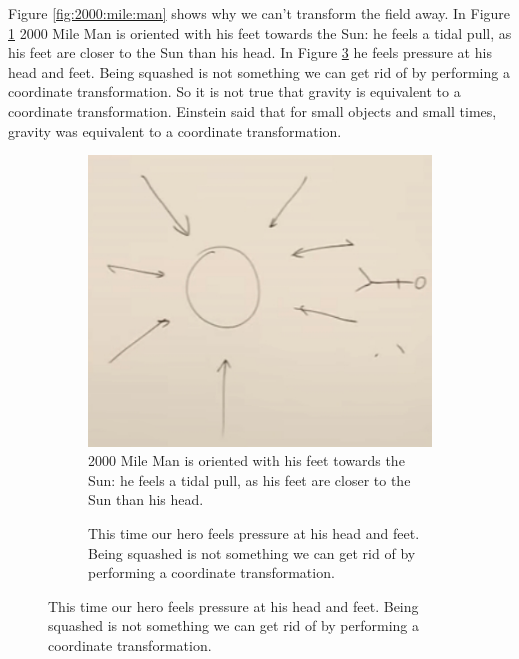 \documentclass[]{article}
\begin{document}
\begin{figure}[H]
\begin{center}
\begin{subfigure}[t]{0.45\textwidth}
		\end{subfigure}
	\end{center}
\end{figure}

Figure \ref{fig:2000:mile:man} shows why we can't transform the field away. In Figure \ref{fig:gr-1-suns-gravitational-field-2000-mile-ff} 2000 Mile Man is oriented with his feet towards the Sun: he feels a tidal pull, as his feet are closer to the Sun than his head. In Figure \ref{fig:gr-1-suns-gravitational-field-2000-mile} he feels pressure at his head and feet. Being squashed is not something we can get rid of by performing a coordinate transformation. So it is not true that gravity is equivalent to a coordinate transformation. Einstein said that for small objects and small times, gravity was equivalent to a coordinate transformation.
\begin{figure}[H]
	\begin{center}
		\caption{The adventures of 2000 mile man}\label{fig:2000:mile:man}
		\begin{subfigure}[t]{0.45\textwidth}
			\caption{ 2000 Mile Man is oriented with his feet towards the Sun: he feels a 	tidal pull, as his feet are closer to the Sun than his head. }\label{fig:gr-1-suns-gravitational-field-2000-mile-ff}
			\includegraphics[width=\textwidth]{gr-1-suns-gravitational-field-2000-mile-ff}
		\end{subfigure}
		\;
		\begin{subfigure}[t]{0.45\textwidth}
			\caption{This time our hero feels pressure at his head and feet. Being squashed 	is not something we can get rid of by performing a coordinate transformation.}\label{fig:gr-1-suns-gravitational-field-2000-mile}

\end{subfigure}
\end{center}
\end{figure}
\end{document}

